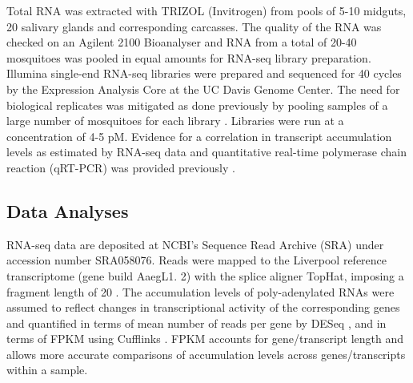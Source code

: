 Total RNA was extracted with TRIZOL (Invitrogen) from pools of 5-10 midguts, 20 salivary glands and corresponding carcasses. The quality of the RNA was checked on an Agilent 2100 Bioanalyser and RNA from a total of 20-40 mosquitoes was pooled in equal amounts for RNA-seq library preparation. Illumina single-end RNA-seq libraries were prepared and sequenced for 40 cycles by the Expression Analysis Core at the UC Davis Genome Center. The need for biological replicates was mitigated as done previously by pooling samples of a large number of mosquitoes for each library \cite{Pitts2011}. Libraries were run at a concentration of 4-5 pM. Evidence for a correlation in transcript accumulation levels as estimated by RNA-seq data and quantitative real-time polymerase chain reaction (qRT-PCR) was provided previously \cite{bonizzoni2012strain}.

\subsection{Data Analyses}

RNA-seq data are deposited at NCBI's Sequence Read Archive (SRA) under accession number SRA058076. Reads were mapped to the Liverpool reference transcriptome (gene build AaegL1. 2) with the splice aligner TopHat, imposing a fragment length of 20 \cite{Trapnell2009}. The accumulation levels of poly-adenylated RNAs were assumed to reflect changes in transcriptional activity of the corresponding genes and quantified in terms of mean number of reads per gene by DESeq \cite{Anders2010}, and in terms of \gls{FPKM} using Cufflinks \cite{Trapnell2010}. FPKM accounts for gene/transcript length and allows more accurate comparisons of accumulation levels across genes/transcripts within a sample.

